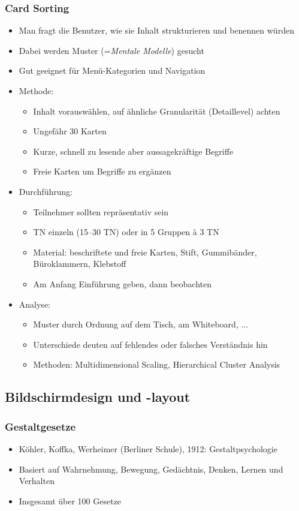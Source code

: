 \documentclass[a4paper,10pt]{article}
\begin{document}
\subsubsection{Card Sorting}
\begin{itemize}
	\item Man fragt die Benutzer, wie sie Inhalt strukturieren und benennen würden
	\item Dabei werden Muster (=\emph{Mentale Modelle}) gesucht
	\item Gut geeignet für Menü-Kategorien und Navigation
	\item Methode:
	\begin{itemize}
		\item Inhalt vorauswählen, auf ähnliche Granularität (Detaillevel) achten
		\item Ungefähr 30 Karten
		\item Kurze, schnell zu lesende aber aussagekräftige Begriffe
		\item Freie Karten um Begriffe zu ergänzen
	\end{itemize}
	\item Durchführung:
	\begin{itemize}
		\item Teilnehmer sollten repräsentativ sein
		\item TN einzeln (15--30 TN) oder in 5 Gruppen à 3 TN
		\item Material: beschriftete und freie Karten, Stift, Gummibänder, Büroklammern, Klebstoff
		\item Am Anfang Einführung geben, dann beobachten
	\end{itemize}
	\item Analyse:
	\begin{itemize}
		\item Muster durch Ordnung auf dem Tisch, am Whiteboard, ...
		\item Unterschiede deuten auf fehlendes oder falsches Verständnis hin
		\item Methoden: Multidimensional Scaling, Hierarchical Cluster Analysis
	\end{itemize}
\end{itemize}

\subsection{Bildschirmdesign und -layout}
\subsubsection{Gestaltgesetze}
\begin{itemize}
	\item Köhler, Koffka, Werheimer (Berliner Schule), 1912: Gestaltpsychologie
	\item Basiert auf Wahrnehmung, Bewegung, Gedächtnis, Denken, Lernen und Verhalten
	\item Insgesamt über 100 Gesetze
\end{itemize}
\end{document}
